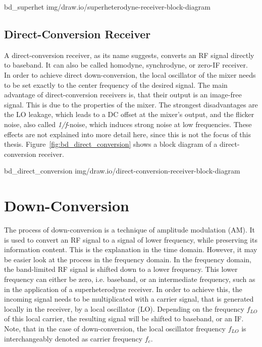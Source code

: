  {bd_superhet} {img/draw.io/superheterodyne-receiver-block-diagram}

\subsection{Direct-Conversion Receiver}

A direct-conversion receiver, as its name suggests, converts an RF signal directly to baseband.
It can also be called homodyne, synchrodyne, or zero-IF receiver.\\

In order to achieve direct down-conversion, the local oscillator of the mixer needs to be set exactly to the center frequency of the desired signal.
The main advantage of direct-conversion receivers is, that their output is an image-free signal.
This is due to the properties of the mixer.
The strongest disadvantages are the LO leakage, which leads to a DC offset at the mixer's output, and the flicker noise, also called \textit{1/f}-noise, which induces strong noise at low frequencies.
These effects are not explained into more detail here, since this is not the focus of this thesis.
Figure~\ref{fig:bd_direct_conversion} shows a block diagram of a direct-conversion receiver.

 {bd_direct_conversion} {img/draw.io/direct-conversion-receiver-block-diagram}


\section{Down-Conversion}

The process of down-conversion is a technique of amplitude modulation (AM).
It is used to convert an RF signal to a signal of lower frequency, while preserving its information content.
This is the explanation in the time domain.
However, it may be easier look at the process in the frequency domain.
In the frequency domain, the band-limited RF signal is shifted down to a lower frequency.
This lower frequency can either be zero, i.e. baseband, or an intermediate frequency, such as in the application of a superheterodyne receiver.
In order to achieve this, the incoming signal needs to be multiplicated with a carrier signal, that is generated locally in the receiver, by a local oscillator (LO).
Depending on the frequency $f_{LO}$ of this local carrier, the resulting signal will be shifted to baseband, or an IF.
Note, that in the case of down-conversion, the local oscillator frequency $f_{LO}$ is interchangeably denoted as carrier frequency $f_c$.\\

